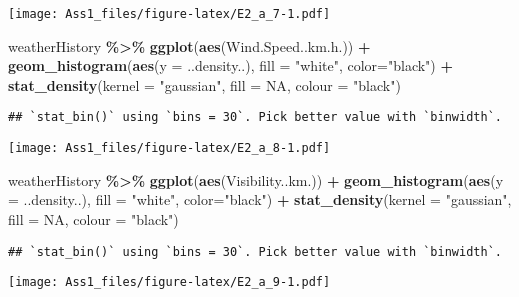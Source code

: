 \documentclass[
]{article}
\newenvironment{Shaded}{\begin{snugshade}}{\end{snugshade}}
\newcommand{\AttributeTok}[1]{\textcolor[rgb]{0.13,0.29,0.53}{#1}}
\newcommand{\ConstantTok}[1]{\textcolor[rgb]{0.56,0.35,0.01}{#1}}
\newcommand{\FunctionTok}[1]{\textcolor[rgb]{0.13,0.29,0.53}{\textbf{#1}}}
\newcommand{\NormalTok}[1]{#1}
\newcommand{\SpecialCharTok}[1]{\textcolor[rgb]{0.81,0.36,0.00}{\textbf{#1}}}
\newcommand{\StringTok}[1]{\textcolor[rgb]{0.31,0.60,0.02}{#1}}
\begin{document}
\texttt{[image: Ass1\_files/figure-latex/E2\_a\_7-1.pdf]}

\begin{Shaded}
\begin{Highlighting}[]
\NormalTok{weatherHistory }\SpecialCharTok{\%\textgreater{}\%}
  \FunctionTok{ggplot}\NormalTok{(}\FunctionTok{aes}\NormalTok{(Wind.Speed..km.h.)) }\SpecialCharTok{+}
  \FunctionTok{geom\_histogram}\NormalTok{(}\FunctionTok{aes}\NormalTok{(}\AttributeTok{y =}\NormalTok{ ..density..), }\AttributeTok{fill =} \StringTok{"white"}\NormalTok{, }\AttributeTok{color=}\StringTok{"black"}\NormalTok{) }\SpecialCharTok{+}
  \FunctionTok{stat\_density}\NormalTok{(}\AttributeTok{kernel =} \StringTok{"gaussian"}\NormalTok{, }\AttributeTok{fill =} \ConstantTok{NA}\NormalTok{, }\AttributeTok{colour =} \StringTok{"black"}\NormalTok{)}
\end{Highlighting}
\end{Shaded}

\begin{verbatim}
## `stat_bin()` using `bins = 30`. Pick better value with `binwidth`.
\end{verbatim}

\texttt{[image: Ass1\_files/figure-latex/E2\_a\_8-1.pdf]}

\begin{Shaded}
\begin{Highlighting}[]
\NormalTok{weatherHistory }\SpecialCharTok{\%\textgreater{}\%}
  \FunctionTok{ggplot}\NormalTok{(}\FunctionTok{aes}\NormalTok{(Visibility..km.)) }\SpecialCharTok{+}
  \FunctionTok{geom\_histogram}\NormalTok{(}\FunctionTok{aes}\NormalTok{(}\AttributeTok{y =}\NormalTok{ ..density..), }\AttributeTok{fill =} \StringTok{"white"}\NormalTok{, }\AttributeTok{color=}\StringTok{"black"}\NormalTok{) }\SpecialCharTok{+}
  \FunctionTok{stat\_density}\NormalTok{(}\AttributeTok{kernel =} \StringTok{"gaussian"}\NormalTok{, }\AttributeTok{fill =} \ConstantTok{NA}\NormalTok{, }\AttributeTok{colour =} \StringTok{"black"}\NormalTok{)}
\end{Highlighting}
\end{Shaded}

\begin{verbatim}
## `stat_bin()` using `bins = 30`. Pick better value with `binwidth`.
\end{verbatim}

\texttt{[image: Ass1\_files/figure-latex/E2\_a\_9-1.pdf]}
\end{document}
